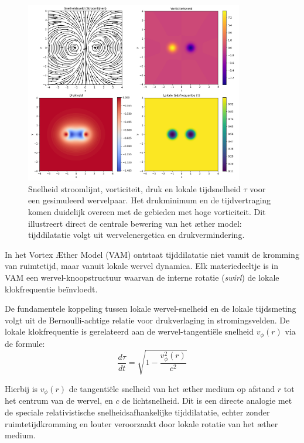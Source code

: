 \begin{figure}[htbp]
\centering
\includegraphics[width=0.85\textwidth]{images/01-streamlinesDiPole_nl}
\caption{Snelheid stroomlijnt, vorticiteit, druk en lokale tijdsnelheid $\tau$ voor een gesimuleerd wervelpaar. Het drukminimum en de tijdvertraging komen duidelijk overeen met de gebieden met hoge vorticiteit. Dit illustreert direct de centrale bewering van het æther model: tijddilatatie volgt uit wervelenergetica en drukvermindering.}
\label{fig:vortexfields}
\end{figure}

In het Vortex Æther Model (VAM) ontstaat tijddilatatie niet vanuit de kromming van ruimtetijd, maar vanuit lokale wervel dynamica. Elk materiedeeltje is in VAM een wervel-knoopstructuur waarvan de interne rotatie (\textit{swirl}) de lokale klokfrequentie beïnvloedt.

De fundamentele koppeling tussen lokale wervel-snelheid en de lokale tijdsmeting volgt uit de Bernoulli-achtige relatie voor drukverlaging in stromingsvelden. De lokale klokfrequentie is gerelateerd aan de wervel-tangentiële snelheid $v_{\phi}(r)$ via de formule:
\begin{equation}\label{eq:vortex_tijddilatatie}
    \frac{d\tau}{dt} = \sqrt{1 - \frac{v_{\phi}^2(r)}{c^2}}
\end{equation}

Hierbij is $v_{\phi}(r)$ de tangentiële snelheid van het æther medium op afstand $r$ tot het centrum van de wervel, en $c$ de lichtsnelheid. Dit is een directe analogie met de speciale relativistische snelheidsafhankelijke tijddilatatie, echter zonder ruimtetijdkromming en louter veroorzaakt door lokale rotatie van het æther medium.

